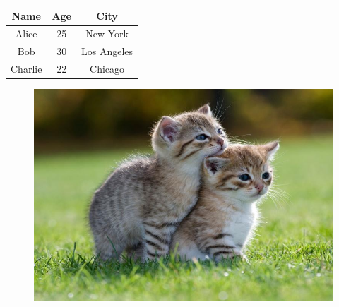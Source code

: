 \documentclass{article}
\begin{document}
\begin{tabular}{|c|c|c|}
\hline
Name & Age & City \\
\hline
Alice & 25 & New York \\
\hline
Bob & 30 & Los Angeles \\
\hline
Charlie & 22 & Chicago \\
\hline
\end{tabular}


\begin{figure}[h]
\centering
\includegraphics[width=5.0in]{../test_image/kittens.jpg}
\end{figure}
\end{document}
